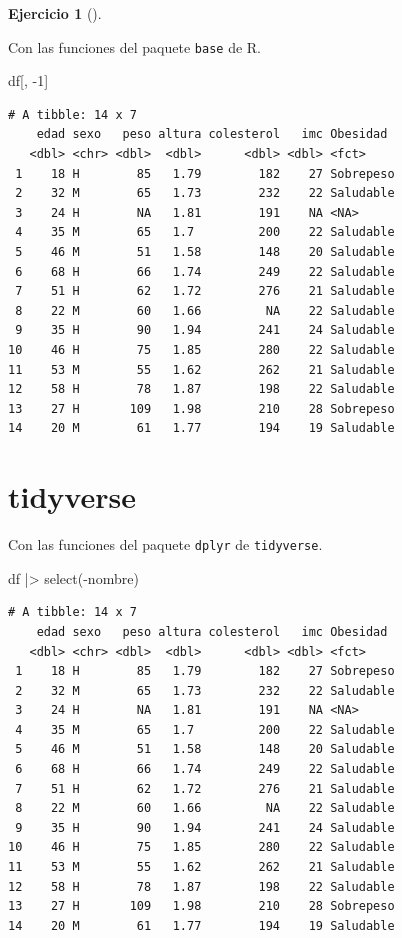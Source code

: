 \documentclass[
  a4paper,
]{scrreport}
\newenvironment{Shaded}{\begin{snugshade}}{\end{snugshade}}
\newcommand{\DecValTok}[1]{\textcolor[rgb]{0.68,0.00,0.00}{#1}}
\newcommand{\FunctionTok}[1]{\textcolor[rgb]{0.28,0.35,0.67}{#1}}
\newcommand{\NormalTok}[1]{\textcolor[rgb]{0.00,0.23,0.31}{#1}}
\newcommand{\SpecialCharTok}[1]{\textcolor[rgb]{0.37,0.37,0.37}{#1}}
\theoremstyle{definition}
\newtheorem{exercise}{Ejercicio}[chapter]
\theoremstyle{remark}
\begin{document}
\begin{exercise}[]
\begin{enumerate}
\begin{tcolorbox}
  Con las funciones del paquete \texttt{base} de R.

\begin{Shaded}
\begin{Highlighting}[]
\NormalTok{df[, }\SpecialCharTok{{-}}\DecValTok{1}\NormalTok{]}
\end{Highlighting}
\end{Shaded}

\begin{verbatim}
# A tibble: 14 x 7
    edad sexo   peso altura colesterol   imc Obesidad 
   <dbl> <chr> <dbl>  <dbl>      <dbl> <dbl> <fct>    
 1    18 H        85   1.79        182    27 Sobrepeso
 2    32 M        65   1.73        232    22 Saludable
 3    24 H        NA   1.81        191    NA <NA>     
 4    35 M        65   1.7         200    22 Saludable
 5    46 M        51   1.58        148    20 Saludable
 6    68 H        66   1.74        249    22 Saludable
 7    51 H        62   1.72        276    21 Saludable
 8    22 M        60   1.66         NA    22 Saludable
 9    35 H        90   1.94        241    24 Saludable
10    46 H        75   1.85        280    22 Saludable
11    53 M        55   1.62        262    21 Saludable
12    58 H        78   1.87        198    22 Saludable
13    27 H       109   1.98        210    28 Sobrepeso
14    20 M        61   1.77        194    19 Saludable
\end{verbatim}

  \section{tidyverse}

  Con las funciones del paquete \texttt{dplyr} de \texttt{tidyverse}.

\begin{Shaded}
\begin{Highlighting}[]
\NormalTok{df }\SpecialCharTok{|\textgreater{}} \FunctionTok{select}\NormalTok{(}\SpecialCharTok{{-}}\NormalTok{nombre)}
\end{Highlighting}
\end{Shaded}

\begin{verbatim}
# A tibble: 14 x 7
    edad sexo   peso altura colesterol   imc Obesidad 
   <dbl> <chr> <dbl>  <dbl>      <dbl> <dbl> <fct>    
 1    18 H        85   1.79        182    27 Sobrepeso
 2    32 M        65   1.73        232    22 Saludable
 3    24 H        NA   1.81        191    NA <NA>     
 4    35 M        65   1.7         200    22 Saludable
 5    46 M        51   1.58        148    20 Saludable
 6    68 H        66   1.74        249    22 Saludable
 7    51 H        62   1.72        276    21 Saludable
 8    22 M        60   1.66         NA    22 Saludable
 9    35 H        90   1.94        241    24 Saludable
10    46 H        75   1.85        280    22 Saludable
11    53 M        55   1.62        262    21 Saludable
12    58 H        78   1.87        198    22 Saludable
13    27 H       109   1.98        210    28 Sobrepeso
14    20 M        61   1.77        194    19 Saludable
\end{verbatim}


\end{tcolorbox}
\end{enumerate}
\end{exercise}
\end{document}
